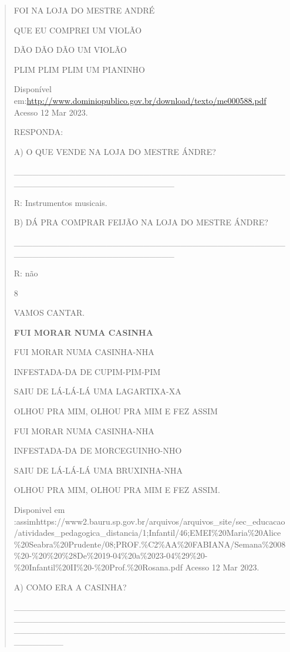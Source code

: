 {{{{\begin{verse}
{{\begin{escolha}
{{{{{FOI NA LOJA DO MESTRE ANDRÉ

QUE EU COMPREI UM VIOLÃO

DÃO DÃO DÃO UM VIOLÃO

PLIM PLIM PLIM UM PIANINHO

Disponível
em:\url{http://www.dominiopublico.gov.br/download/texto/me000588.pdf}
Acesso 12 Mar 2023.

RESPONDA:

A) O QUE VENDE NA LOJA DO MESTRE ÁNDRE?

\_\_\_\_\_\_\_\_\_\_\_\_\_\_\_\_\_\_\_\_\_\_\_\_\_\_\_\_\_\_\_\_\_\_\_\_\_\_\_\_\_\_\_\_\_\_\_\_\_\_\_\_\_\_\_\_\_\_\_\_\_\_\_\_\_\_\_\_\_\_

R: Instrumentos musicais.

B) DÁ PRA COMPRAR FEIJÃO NA LOJA DO MESTRE ÁNDRE?

\_\_\_\_\_\_\_\_\_\_\_\_\_\_\_\_\_\_\_\_\_\_\_\_\_\_\_\_\_\_\_\_\_\_\_\_\_\_\_\_\_\_\_\_\_\_\_\_\_\_\_\_\_\_\_\_\_\_\_\_\_\_\_\_\_\_\_\_\_\_

R: não

\num{8}

VAMOS CANTAR.

\textbf{FUI MORAR NUMA CASINHA}

FUI MORAR NUMA CASINHA-NHA

INFESTADA-DA DE CUPIM-PIM-PIM

SAIU DE LÁ-LÁ-LÁ UMA LAGARTIXA-XA

OLHOU PRA MIM, OLHOU PRA MIM E FEZ ASSIM

FUI MORAR NUMA CASINHA-NHA

INFESTADA-DA DE MORCEGUINHO-NHO

SAIU DE LÁ-LÁ-LÁ UMA BRUXINHA-NHA

OLHOU PRA MIM, OLHOU PRA MIM E FEZ ASSIM.

Disponivel em
:assimhttps://www2.bauru.sp.gov.br/arquivos/arquivos\_site/sec\_educacao/atividades\_pedagogica\_distancia/1;Infantil/46;EMEI\%20Maria\%20Alice\%20Seabra\%20Prudente/08;PROF.\%C2\%AA\%20FABIANA/Semana\%2008\%20-\%20\%20\%28De\%2019-04\%20a\%2023-04\%29\%20-\%20Infantil\%20II\%20-\%20Prof.\%20Rosana.pdf
Acesso 12 Mar 2023.

A) COMO ERA A CASINHA?

\_\_\_\_\_\_\_\_\_\_\_\_\_\_\_\_\_\_\_\_\_\_\_\_\_\_\_\_\_\_\_\_\_\_\_\_\_\_\_\_\_\_\_\_\_\_\_\_\_\_\_\_\_\_\_\_\_\_\_\_\_\_\_\_\_\_\_\_\_\_\_\_\_\_\_\_\_\_\_\_\_\_\_\_\_\_\_\_\_\_\_\_\_\_\_\_\_\_\_\_\_\_\_\_\_\_\_\_\_\_\_\_\_\_\_\_\_\_\_\_\_\_\_\_\_\_\_\_\_\_\_\_\_\_\_\_\_\_\_\_

}}}}}
\end{escolha}}}
\end{verse}}}}}

